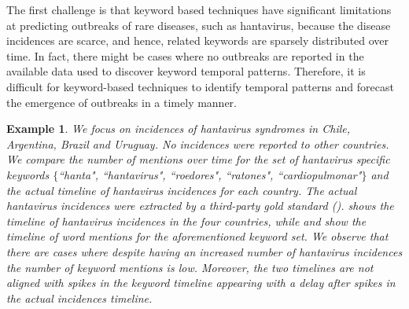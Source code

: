 \documentclass[conference]{IEEEtran}
\newtheorem{example}{Example}
\begin{document}
The first challenge is that keyword based techniques have significant limitations at predicting outbreaks of rare diseases, such as hantavirus, because the disease incidences are scarce, and hence, related keywords are sparsely distributed over time.  In fact, there might be cases where no outbreaks are reported in the available data used to discover keyword temporal patterns. Therefore, it is difficult for keyword-based techniques to identify temporal patterns and forecast the emergence of outbreaks in a timely manner.

\begin{example}
{\em We focus on incidences of hantavirus syndromes in Chile, Argentina, Brazil and Uruguay. No incidences were reported to other countries. We compare the number of mentions over time for the set of hantavirus specific keywords $\{$``hanta", ``hantavirus", ``roedores", ``ratones", ``cardiopulmonar"$\}$ and the actual timeline of hantavirus incidences for each country. The actual hantavirus incidences were extracted by a third-party gold standard ().   shows the timeline of hantavirus incidences in the four countries, while  and  show the timeline of word mentions for the aforementioned keyword set. We observe that there are cases where despite having an increased number of hantavirus incidences the number of keyword mentions is low. Moreover, the two timelines are not aligned with spikes in the keyword timeline appearing with a delay after spikes in the actual incidences timeline.}
\end{example}
\end{document}
